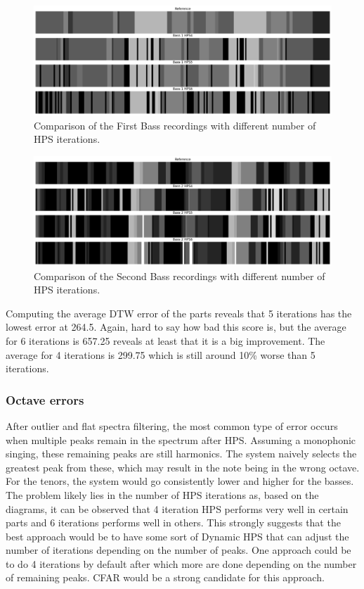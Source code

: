 \begin{figure}[ht]
    \centering
    \includegraphics[width=\textwidth]{./images/hpsBass1.png}
    \caption{Comparison of the First Bass recordings with different number of HPS iterations. \label{fig:hpsBass1}}
\end{figure}


\begin{figure}[ht]
    \centering
    \includegraphics[width=\textwidth]{./images/hpsBass2.png}
    \caption{Comparison of the Second Bass recordings with different number of HPS iterations. \label{fig:hpsBass2}}
\end{figure}

Computing the average DTW error of the parts reveals that 5 iterations has the lowest error at 264.5. Again, hard to say how bad this score is, but the average for 6 iterations is 657.25 reveals at least that it is a big improvement. The average for 4 iterations is 299.75 which is still around 10\% worse than 5 iterations.

\subsubsection{Octave errors}
After outlier and flat spectra filtering, the most common type of error occurs when multiple peaks remain in the spectrum after HPS. Assuming a monophonic singing, these remaining peaks are still harmonics. The system naively selects the greatest peak from these, which may result in the note being in the wrong octave. For the tenors, the system would go consistently lower and higher for the basses. The problem likely lies in the number of HPS iterations as, based on the diagrams, it can be observed that 4 iteration HPS performs very well in certain parts and 6 iterations performs well in others. This strongly suggests that the best approach would be to have some sort of Dynamic HPS that can adjust the number of iterations depending on the number of peaks. One approach could be to do 4 iterations by default after which more are done depending on the number of remaining peaks. CFAR would be a strong candidate for this approach.

